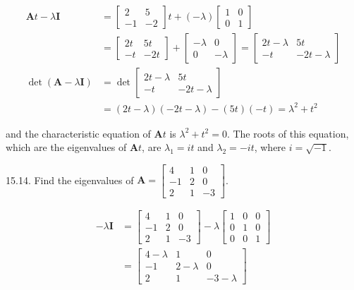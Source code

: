 \documentclass[10pt]{article}
\begin{document}
$$
\begin{aligned}
\mathbf{A} t-\lambda \mathbf{I} & =\left[\begin{array}{rr}
2 & 5 \\
-1 & -2
\end{array}\right] t+(-\lambda)\left[\begin{array}{ll}
1 & 0 \\
0 & 1
\end{array}\right] \\
& =\left[\begin{array}{rr}
2 t & 5 t \\
-t & -2 t
\end{array}\right]+\left[\begin{array}{rr}
-\lambda & 0 \\
0 & -\lambda
\end{array}\right]=\left[\begin{array}{cc}
2 t-\lambda & 5 t \\
-t & -2 t-\lambda
\end{array}\right] \\
\operatorname{det}(\mathbf{A}-\lambda \mathbf{I}) & =\operatorname{det}\left[\begin{array}{cc}
2 t-\lambda & 5 t \\
-t & -2 t-\lambda
\end{array}\right] \\
& =(2 t-\lambda)(-2 t-\lambda)-(5 t)(-t)=\lambda^{2}+t^{2}
\end{aligned}
$$

and the characteristic equation of $\mathbf{A} t$ is $\lambda^{2}+t^{2}=0$. The roots of this equation, which are the eigenvalues of $\mathbf{A} t$, are $\lambda_{1}=i t$ and $\lambda_{2}=-i t$, where $i=\sqrt{-1}$.

15.14. Find the eigenvalues of $\mathbf{A}=\left[\begin{array}{rrr}4 & 1 & 0 \\ -1 & 2 & 0 \\ 2 & 1 & -3\end{array}\right]$.

$$
\begin{aligned}
-\lambda \mathbf{I} & =\left[\begin{array}{rrr}
4 & 1 & 0 \\
-1 & 2 & 0 \\
2 & 1 & -3
\end{array}\right]-\lambda\left[\begin{array}{lll}
1 & 0 & 0 \\
0 & 1 & 0 \\
0 & 0 & 1
\end{array}\right] \\
& =\left[\begin{array}{ccc}
4-\lambda & 1 & 0 \\
-1 & 2-\lambda & 0 \\
2 & 1 & -3-\lambda
\end{array}\right]
\end{aligned}
$$
\end{document}
